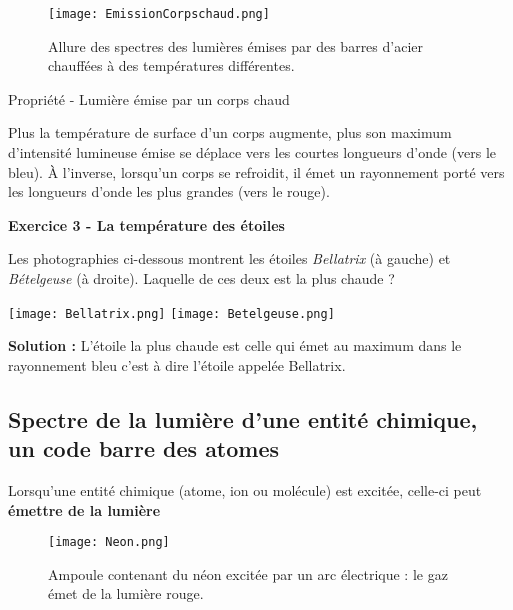 \documentclass[french, a4paper, 12pt]{article}
\newcommand{\exo}[3]{
	\begin{mdframed}[style=exo, leftmargin=0pt, rightmargin=0pt, innertopmargin=8pt, innerbottommargin=8pt, innerrightmargin=10pt, innerleftmargin=10pt]

		\noindent \textbf{Exercice #1 - #2}\medskip

		#3
	\end{mdframed}
}
\begin{document}
\begin{figure}[ht]
	\centering
	\texttt{[image: EmissionCorpschaud.png]}
	\caption{Allure des spectres des lumières émises par des barres d'acier chauffées à des températures différentes.}
\end{figure}

\begin{Proposition}{Propriété - Lumière émise par un corps chaud}
	\bigskip

	Plus la température de surface d'un corps augmente, plus son maximum d'intensité lumineuse émise se déplace vers les courtes longueurs d'onde (vers le bleu). À l'inverse, lorsqu'un corps se refroidit, il émet un rayonnement porté vers les longueurs d'onde les plus grandes (vers le rouge).



\end{Proposition}


\exo{3}{La température des étoiles}{
	Les photographies ci-dessous montrent les étoiles \textit{Bellatrix} (à gauche) et \textit{Bételgeuse} (à droite). Laquelle de ces deux est la plus chaude ? 

	\begin{center}
	\texttt{[image: Bellatrix.png]}\hspace{1cm}
	\texttt{[image: Betelgeuse.png]}\bigskip
\end{center}
	\textbf{Solution :} L'étoile la plus chaude est celle qui émet au maximum dans le rayonnement bleu c'est à dire l'étoile appelée Bellatrix.

}
\clearpage
\subsection{Spectre de la lumière d'une entité chimique, un code barre des atomes}

Lorsqu'une entité chimique (atome, ion ou molécule) est excitée, celle-ci peut \textbf{émettre de la lumière}

\begin{figure}[ht]
	\centering
	\texttt{[image: Neon.png]}
	\caption{Ampoule contenant du néon excitée par un arc électrique : le gaz émet de la lumière rouge.}
\end{figure}
\end{document}
